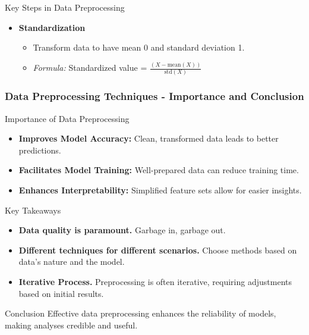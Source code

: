 \documentclass[aspectratio=169]{beamer}
\begin{document}
\begin{frame}[fragile]
\begin{block}{Key Steps in Data Preprocessing}
\begin{enumerate}
\begin{itemize}
\begin{itemize}
                        \end{itemize}
                    \item \textbf{Standardization}
                        \begin{itemize}
                            \item Transform data to have mean 0 and standard deviation 1.
                            \item \textit{Formula:} Standardized value = \(\frac{(X - \text{mean}(X))}{\text{std}(X)}\)
                        \end{itemize}
                \end{itemize}
        \end{enumerate}
    \end{block}
\end{frame}

\begin{frame}[fragile]
    \frametitle{Data Preprocessing Techniques - Importance and Conclusion}
    \begin{block}{Importance of Data Preprocessing}
        \begin{itemize}
            \item \textbf{Improves Model Accuracy:} Clean, transformed data leads to better predictions.
            \item \textbf{Facilitates Model Training:} Well-prepared data can reduce training time.
            \item \textbf{Enhances Interpretability:} Simplified feature sets allow for easier insights.
        \end{itemize}
    \end{block}

    \begin{block}{Key Takeaways}
        \begin{itemize}
            \item \textbf{Data quality is paramount.} Garbage in, garbage out.
            \item \textbf{Different techniques for different scenarios.} Choose methods based on data's nature and the model.
            \item \textbf{Iterative Process.} Preprocessing is often iterative, requiring adjustments based on initial results.
        \end{itemize}
    \end{block}

    \begin{block}{Conclusion}
        Effective data preprocessing enhances the reliability of models, making analyses credible and useful.
    \end{block}
\end{frame}
\end{document}
